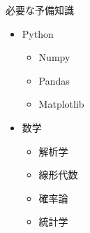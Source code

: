 \documentclass[aspectratio=169, dvipdfmx, 14pt, xcolor={svgnames,dvipsnames}]{beamer}
\def\tightlist{\itemsep1pt\parskip0pt\parsep0pt}
\begin{document}
\begin{frame}{必要な予備知識}
  \begin{itemize}
    \tightlist
    \item
          Python

          \begin{itemize}
            \tightlist
            \item
                  Numpy
            \item
                  Pandas
            \item
                  Matplotlib
          \end{itemize}
    \item
          数学

          \begin{itemize}
            \tightlist
            \item
                  解析学
            \item
                  線形代数
            \item
                  確率論
            \item
                  統計学
          \end{itemize}
  \end{itemize}
\end{frame}
\end{document}
